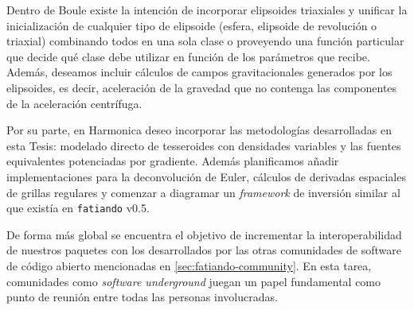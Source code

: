 Dentro de Boule existe la intención de incorporar elipsoides triaxiales
y unificar la inicialización de cualquier tipo de elipsoide (esfera, elipsoide
de revolución o triaxial) combinando todos en una sola clase o proveyendo una
función particular que decide qué clase debe utilizar en función de los
parámetros que recibe.
Además, deseamos incluir cálculos de campos gravitacionales generados por los
elipsoides, es decir, aceleración de la gravedad que no contenga las
componentes de la aceleración centrífuga.

Por su parte, en Harmonica deseo incorporar las metodologías desarrolladas
en esta Tesis: modelado directo de tesseroides con densidades variables y las
fuentes equivalentes potenciadas por gradiente.
Además planificamos añadir implementaciones para la deconvolución de Euler,
cálculos de derivadas espaciales de grillas regulares y comenzar a diagramar un
\emph{framework} de inversión similar al que existía en \texttt{fatiando} v0.5.

De forma más global se encuentra el objetivo de incrementar la
interoperabilidad de nuestros paquetes con los desarrollados por las otras
comunidades de software de código abierto mencionadas en
\ref{sec:fatiando-community}.
En esta tarea, comunidades como \emph{software underground} juegan un papel
fundamental como punto de reunión entre todas las personas involucradas.








